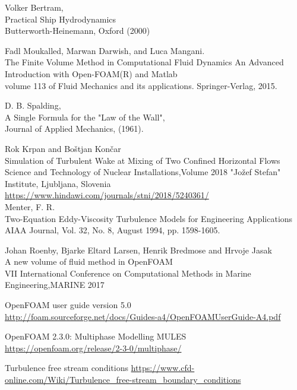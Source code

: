 \documentclass[a4paper, 12pt]{report}
\begin{document}
\begin{thebibliography}{9}
	Volker Bertram,\\
	Practical Ship Hydrodynamics\\
	Butterworth-Heinemann, Oxford (2000)
	
	Fadl Moukalled, Marwan Darwish, and Luca Mangani.\\
	The Finite Volume Method in Computational Fluid Dynamics An Advanced Introduction with 	Open-FOAM(R) and Matlab\\
	volume 113 of Fluid Mechanics and its applications. Springer-Verlag, 2015.
	
	D. B. Spalding,\\
	A Single Formula for the "Law of the Wall",\\ 
	Journal of Applied Mechanics, (1961).
	
	Rok Krpan and Boštjan Končar\\
	Simulation of Turbulent Wake at Mixing of Two Confined Horizontal Flows
	Science and Technology of Nuclear Installations,Volume 2018 "Jožef Stefan" Institute, 		Ljubljana, Slovenia
	\url{https://www.hindawi.com/journals/stni/2018/5240361/}\\
	
	Menter, F. R.\\
	Two-Equation Eddy-Viscosity Turbulence Models for Engineering Applications\\
	AIAA Journal, Vol. 32, No. 8, August 1994, pp. 1598-1605.
	
	Johan Roenby, Bjarke Eltard Larsen, Henrik Bredmose and Hrvoje Jasak\\
	A new volume of fluid method in OpenFOAM\\
	VII International Conference on Computational Methods in Marine Engineering,MARINE 			2017
	
	OpenFOAM user guide version 5.0\\	
	\url{http://foam.sourceforge.net/docs/Guides-a4/OpenFOAMUserGuide-A4.pdf}
	
	OpenFOAM 2.3.0: Multiphase Modelling MULES\\
	\url{https://openfoam.org/release/2-3-0/multiphase/}
	
	Turbulence free stream conditions
	\url{https://www.cfd-online.com/Wiki/Turbulence_free-stream_boundary_conditions}
\end{thebibliography}
\end{document}
